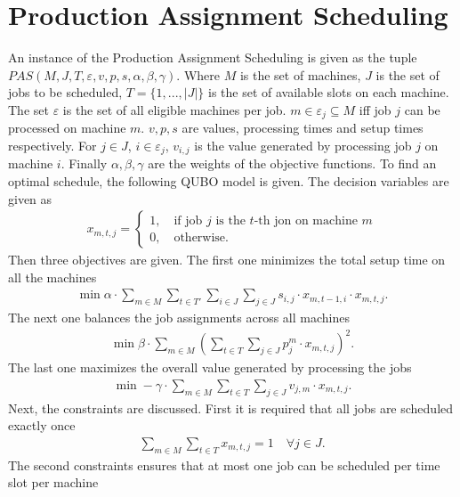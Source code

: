 \documentclass[12pt]{article}
\begin{document}
\section{Production Assignment Scheduling}
An instance of the Production Assignment Scheduling is given as the tuple $PAS(M, J, T, \varepsilon, v, p, s, \alpha, \beta, \gamma)$.
Where $M$ is the set of machines, $J$ is the set of jobs to be scheduled, $T = \{1, ..., |J|\}$ is the set of available slots on each machine.
The set $\varepsilon$ is the set of all eligible machines per job.
$m \in \varepsilon_j \subseteq M$ iff job $j$ can be processed on machine $m$.
$v, p, s$ are values, processing times and setup times respectively.
For $j \in J$, $i \in \varepsilon_j$, $v_{i,j}$ is the value generated by processing job $j$ on machine $i$.
Finally $\alpha, \beta, \gamma$ are the weights of the objective functions.
To find an optimal schedule, the following QUBO model is given.
The decision variables are given as 
\begin{gather}
x_{m, t, j} = \begin{cases} 1, \quad \text{if job $j$ is the $t$-th jon on machine $m$} \\
0, \quad \text{otherwise}.
\end{cases}
\end{gather}
Then three objectives are given.
The first one minimizes the total setup time on all the machines
\begin{gather}
\min \alpha \cdot \sum_{m \in M} \sum_{t \in T'} \sum_{i \in J}\sum_{j \in J} s_{i,j} \cdot x_{m, t-1, i} \cdot x_{m, t, j}. \label{PAS-obj-1}
\end{gather}
The next one balances the job assignments across all machines
\begin{gather}
\min \beta \cdot \sum_{m \in M} \left( \sum_{t \in T} \sum_{j \in J} p^m_j \cdot x_{m,t,j} \right)^2. \label{PAS-obj-2}
\end{gather}
The last one maximizes the overall value generated by processing the jobs
\begin{gather}
\min -\gamma \cdot \sum_{m \in M}  \sum_{t \in T}  \sum_{j \in J} v_{j,m} \cdot x_{m, t, j}. \label{PAS-obj-3}
\end{gather}
Next, the constraints are discussed.
First it is required that all jobs are scheduled exactly once
\begin{gather}
\sum_{m \in M} \sum_{t \in T} x_{m,t,j} = 1 \quad \forall j \in J. \label{PAS-1}
\end{gather}
The second constraints ensures that at most one job can be scheduled per time slot per machine
\end{document}
